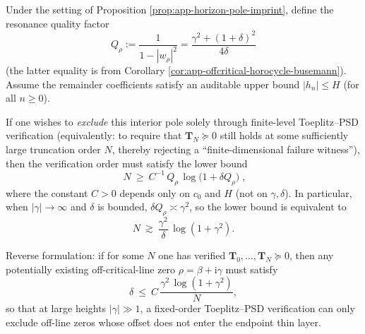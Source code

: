 \begin{theorem}\label{thm:app-horizon-toeplitz-detection-threshold}
Under the setting of Proposition \ref{prop:app-horizon-pole-imprint}, define the resonance quality factor
\begin{equation}\label{eq:app-horizon-Qrho-def}
\boxed{\;
Q_\rho:=\frac{1}{1-|w_\rho|^2}
=\frac{\gamma^2+(1+\delta)^2}{4\delta}\;}
\end{equation}
(the latter equality is from Corollary \ref{cor:app-offcritical-horocycle-busemann}).
Assume the remainder coefficients satisfy an auditable upper bound \(|h_n|\le H\) (for all \(n\ge 0\)).
\par
If one wishes to \emph{exclude} this interior pole solely through finite-level Toeplitz--PSD verification (equivalently: to require that \(\mathbf{T}_N\succeq 0\) still holds at some sufficiently large truncation order \(N\), thereby rejecting a ``finite-dimensional failure witness''), then the verification order must satisfy the lower bound
\begin{equation}\label{eq:app-horizon-toeplitz-detect-threshold}
\boxed{\;
N\ \ge\ C^{-1}\,Q_\rho\,\log\!\bigl(1+\delta Q_\rho\bigr)\;},
\end{equation}
where the constant \(C>0\) depends only on \(c_0\) and \(H\) (not on \(\gamma,\delta\)).
In particular, when \(|\gamma|\to\infty\) and \(\delta\) is bounded, \(\delta Q_\rho\asymp \gamma^2\), so the lower bound is equivalent to
\[
N\ \gtrsim\ \frac{\gamma^2}{\delta}\,\log(1+\gamma^2).
\]
\par
Reverse formulation: if for some \(N\) one has verified \(\mathbf{T}_0,\dots,\mathbf{T}_N\succeq 0\), then any potentially existing off-critical-line zero \(\rho=\beta+\mathrm{i}\gamma\) must satisfy
\[
\delta\ \le\ C\,\frac{\gamma^2\,\log(1+\gamma^2)}{N},
\]
so that at large heights \(|\gamma|\gg 1\), a fixed-order Toeplitz--PSD verification can only exclude off-line zeros whose offset does not enter the endpoint thin layer.
\end{theorem}


